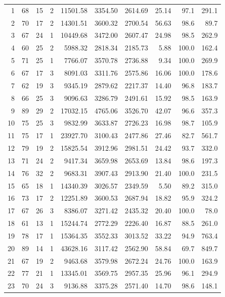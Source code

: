 \begin{longtable}{rrrrrrrrrr}
1 & 68 & 15 & 2 & 11501.58 & 3354.50 & 2614.69 & 25.14 & 97.1 & 291.1 \\
2 & 70 & 17 & 2 & 14301.51 & 3600.32 & 2700.54 & 56.63 & 98.6 & 89.7 \\
3 & 67 & 24 & 1 & 10449.68 & 3472.00 & 2607.47 & 24.98 & 98.5 & 262.9 \\
4 & 60 & 25 & 2 & 5988.32 & 2818.34 & 2185.73 & 5.88 & 100.0 & 162.4 \\
5 & 71 & 25 & 1 & 7766.07 & 3570.78 & 2736.88 & 9.34 & 100.0 & 269.9 \\
6 & 67 & 17 & 3 & 8091.03 & 3311.76 & 2575.86 & 16.06 & 100.0 & 178.6 \\
7 & 62 & 19 & 3 & 9345.19 & 2879.62 & 2217.37 & 14.40 & 96.8 & 183.7 \\
8 & 66 & 25 & 3 & 9096.63 & 3286.79 & 2491.61 & 15.92 & 98.5 & 163.9 \\
9 & 89 & 29 & 2 & 17032.15 & 4765.06 & 3526.70 & 42.07 & 96.6 & 357.3 \\
10 & 75 & 25 & 3 & 9832.99 & 3633.87 & 2726.23 & 16.98 & 98.7 & 105.9 \\
11 & 75 & 17 & 1 & 23927.70 & 3100.43 & 2477.86 & 27.46 & 82.7 & 561.7 \\
12 & 79 & 19 & 2 & 15825.54 & 3912.96 & 2981.51 & 24.42 & 93.7 & 332.0 \\
13 & 71 & 24 & 2 & 9417.34 & 3659.98 & 2653.69 & 13.84 & 98.6 & 197.3 \\
14 & 76 & 32 & 2 & 9683.31 & 3907.43 & 2913.90 & 21.40 & 100.0 & 231.5 \\
15 & 65 & 18 & 1 & 14340.39 & 3026.57 & 2349.59 & 5.50 & 89.2 & 315.0 \\
16 & 73 & 17 & 2 & 12251.89 & 3600.53 & 2687.94 & 18.82 & 95.9 & 324.2 \\
17 & 67 & 26 & 3 & 8386.07 & 3271.42 & 2435.32 & 20.40 & 100.0 & 78.0 \\
18 & 61 & 13 & 1 & 15244.74 & 2772.29 & 2226.40 & 16.87 & 88.5 & 261.0 \\
19 & 78 & 17 & 1 & 15364.35 & 3552.33 & 3013.52 & 33.22 & 94.9 & 763.4 \\
20 & 89 & 14 & 1 & 43628.16 & 3117.42 & 2562.90 & 58.84 & 69.7 & 849.7 \\
21 & 67 & 19 & 2 & 9463.68 & 3579.98 & 2672.24 & 24.76 & 100.0 & 163.9 \\
22 & 77 & 21 & 1 & 13345.01 & 3569.75 & 2957.35 & 25.96 & 96.1 & 294.9 \\
23 & 70 & 24 & 3 & 9136.88 & 3375.28 & 2571.40 & 14.70 & 98.6 & 148.1 \\

\end{longtable}
